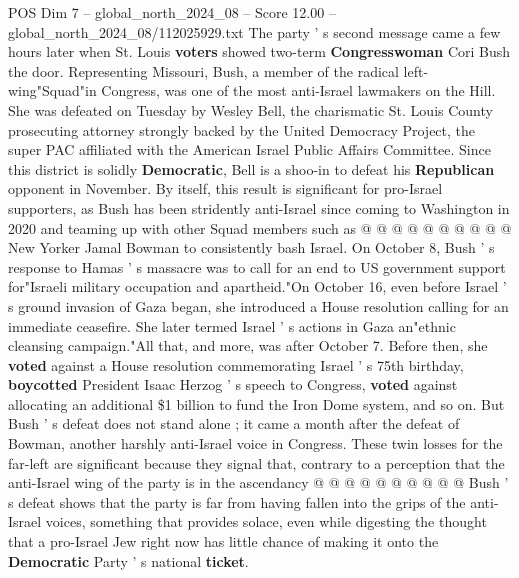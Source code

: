 \begin{textsample}{POS Dim 7 – global\_north\_2024\_08 – Score 12.00 – global\_north\_2024\_08/112025929.txt}
The party ' s second message came a few hours later when St.
Louis \textbf{voters} showed two-term \textbf{Congresswoman} Cori Bush the door.
Representing Missouri, Bush, a member of the radical left-wing"Squad"in Congress, was one of the most anti-Israel lawmakers on the Hill.
She was defeated on Tuesday by Wesley Bell, the charismatic St.
Louis County prosecuting attorney strongly backed by the United Democracy Project, the super PAC affiliated with the American Israel Public Affairs Committee.
Since this district is solidly \textbf{Democratic}, Bell is a shoo-in to defeat his \textbf{Republican} opponent in November.
By itself, this result is significant for pro-Israel supporters, as Bush has been stridently anti-Israel since coming to Washington in 2020 and teaming up with other Squad members such as @ @ @ @ @ @ @ @ @ @ New Yorker Jamal Bowman to consistently bash Israel.
On October 8, Bush ' s response to Hamas ' s massacre was to call for an end to US government support for"Israeli military occupation and apartheid."On October 16, even before Israel ' s ground invasion of Gaza began, she introduced a House resolution calling for an immediate ceasefire.
She later termed Israel ' s actions in Gaza an"ethnic cleansing campaign."All that, and more, was after October 7.
Before then, she \textbf{voted} against a House resolution commemorating Israel ' s 75th birthday, \textbf{boycotted} President Isaac Herzog ' s speech to Congress, \textbf{voted} against allocating an additional \$1 billion to fund the Iron Dome system, and so on.
But Bush ' s defeat does not stand alone ; it came a month after the defeat of Bowman, another harshly anti-Israel voice in Congress.
These twin losses for the far-left are significant because they signal that, contrary to a perception that the anti-Israel wing of the party is in the ascendancy @ @ @ @ @ @ @ @ @ @ Bush ' s defeat shows that the party is far from having fallen into the grips of the anti-Israel voices, something that provides solace, even while digesting the thought that a pro-Israel Jew right now has little chance of making it onto the \textbf{Democratic} Party ' s national \textbf{ticket}.

\end{textsample}
